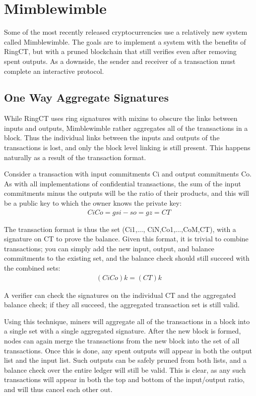 \documentclass{article}
\begin{document}
\section{Mimblewimble}

Some of the most recently released cryptocurrencies use a relatively new system called Mimblewimble.  The goals are to implement a system with the benefits of RingCT, but with a pruned blockchain that still verifies even after removing spent outputs.  As a downside, the sender and receiver of a transaction must complete an interactive protocol.


\subsection{One Way Aggregate Signatures}

While RingCT uses ring signatures with mixins to obscure the links between inputs and outputs, Mimblewimble rather aggregates all of the transactions in a block.  Thus the individual links between the inputs and outputs of the transactions is lost, and only the block level linking is still present.  This happens naturally as a result of the transaction format.

Consider a transaction with input commitments Ci and output commitments Co.  As with all implementations of confidential transactions, the sum of the input commitments minus the outputs will be the ratio of their products, and this will be a public key to which the owner knows the private key:
\begin{align}
  Ci Co=g si -  so=gz=CT
\end{align}

The transaction format is thus the set (Ci1,..., CiN,Co1,...,CoM,CT), with a signature on CT to prove the balance.  Given this format, it is trivial to combine transactions; you can simply add the new input, output, and balance commitments to the existing set, and the balance check should still succeed with the combined sets:
\begin{align}
  (  Ci Co)k= (CT)k
\end{align}

A verifier can check the signatures on the individual CT and the aggregated balance check; if they all succeed, the aggregated transaction set is still valid.

Using this technique, miners will aggregate all of the transactions in a block into a single set with a single aggregated signature.  After the new block is formed, nodes can again merge the transactions from the new block into the set of all transactions.  Once this is done, any spent outputs will appear in both the output list and the input list.  Such outputs can be safely pruned from both lists, and a balance check over the entire ledger will still be valid.  This is clear, as any such transactions will appear in both the top and bottom of the input/output ratio, and will thus cancel each other out.  
\end{document}

